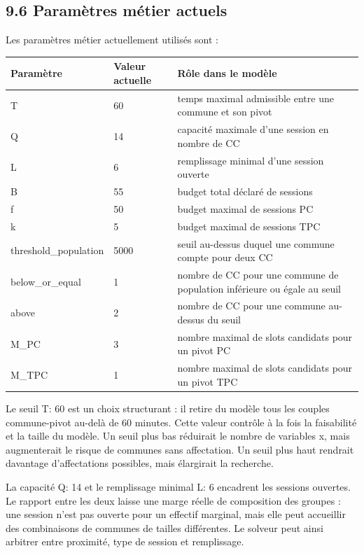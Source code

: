 \documentclass[11pt,a4paper]{article}
\begin{document}
\subsection{9.6 Paramètres métier actuels}

Les paramètres métier actuellement utilisés sont :

\begin{longtable}{|L{0.24\textwidth}|L{0.18\textwidth}|L{0.48\textwidth}|}
\hline
Paramètre & Valeur actuelle & Rôle dans le modèle \\
\hline
\endhead
T & 60 & temps maximal admissible entre une commune et son pivot \\
\hline
Q & 14 & capacité maximale d'une session en nombre de CC \\
\hline
L & 6 & remplissage minimal d'une session ouverte \\
\hline
B & 55 & budget total déclaré de sessions \\
\hline
f & 50 & budget maximal de sessions PC \\
\hline
k & 5 & budget maximal de sessions TPC \\
\hline
threshold\_population & 5000 & seuil au-dessus duquel une commune compte pour deux CC \\
\hline
below\_or\_equal & 1 & nombre de CC pour une commune de population inférieure ou égale au seuil \\
\hline
above & 2 & nombre de CC pour une commune au-dessus du seuil \\
\hline
M\_PC & 3 & nombre maximal de slots candidats pour un pivot PC \\
\hline
M\_TPC & 1 & nombre maximal de slots candidats pour un pivot TPC \\
\hline
\end{longtable}

Le seuil T: 60 est un choix structurant : il retire du modèle tous les couples commune-pivot au-delà de 60 minutes. Cette valeur contrôle à la fois la faisabilité et la taille du modèle. Un seuil plus bas réduirait le nombre de variables x, mais augmenterait le risque de communes sans affectation. Un seuil plus haut rendrait davantage d'affectations possibles, mais élargirait la recherche.

La capacité Q: 14 et le remplissage minimal L: 6 encadrent les sessions ouvertes. Le rapport entre les deux laisse une marge réelle de composition des groupes : une session n'est pas ouverte pour un effectif marginal, mais elle peut accueillir des combinaisons de communes de tailles différentes. Le solveur peut ainsi arbitrer entre proximité, type de session et remplissage.
\end{document}
